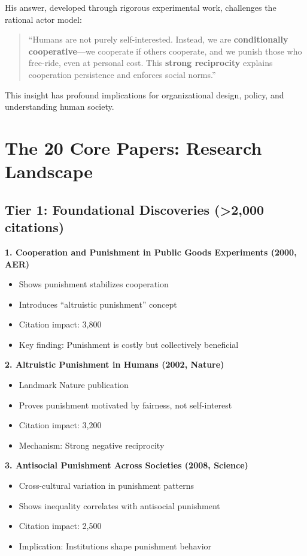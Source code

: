 \documentclass[11pt]{article}
\begin{document}
His answer, developed through rigorous experimental work, challenges the rational
actor model:

\begin{quote}
``Humans are not purely self-interested. Instead, we are \textbf{conditionally
cooperative}—we cooperate if others cooperate, and we punish those who free-ride,
even at personal cost. This \textbf{strong reciprocity} explains cooperation
persistence and enforces social norms.''
\end{quote}

This insight has profound implications for organizational design, policy, and
understanding human society.

\section*{The 20 Core Papers: Research Landscape}

\subsection*{Tier 1: Foundational Discoveries (>2,000 citations)}

\textbf{1. Cooperation and Punishment in Public Goods Experiments (2000, AER)}
\begin{itemize}
    \item Shows punishment stabilizes cooperation
    \item Introduces ``altruistic punishment'' concept
    \item Citation impact: 3,800
    \item Key finding: Punishment is costly but collectively beneficial
\end{itemize}

\textbf{2. Altruistic Punishment in Humans (2002, Nature)}
\begin{itemize}
    \item Landmark Nature publication
    \item Proves punishment motivated by fairness, not self-interest
    \item Citation impact: 3,200
    \item Mechanism: Strong negative reciprocity
\end{itemize}

\textbf{3. Antisocial Punishment Across Societies (2008, Science)}
\begin{itemize}
    \item Cross-cultural variation in punishment patterns
    \item Shows inequality correlates with antisocial punishment
    \item Citation impact: 2,500
    \item Implication: Institutions shape punishment behavior
\end{itemize}
\end{document}
